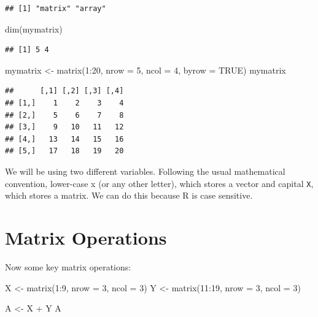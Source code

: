 \documentclass[
]{book}
\newenvironment{Shaded}{\begin{snugshade}}{\end{snugshade}}
\newcommand{\AttributeTok}[1]{\textcolor[rgb]{0.77,0.63,0.00}{#1}}
\newcommand{\ConstantTok}[1]{\textcolor[rgb]{0.00,0.00,0.00}{#1}}
\newcommand{\DecValTok}[1]{\textcolor[rgb]{0.00,0.00,0.81}{#1}}
\newcommand{\FunctionTok}[1]{\textcolor[rgb]{0.00,0.00,0.00}{#1}}
\newcommand{\NormalTok}[1]{#1}
\newcommand{\OtherTok}[1]{\textcolor[rgb]{0.56,0.35,0.01}{#1}}
\newcommand{\SpecialCharTok}[1]{\textcolor[rgb]{0.00,0.00,0.00}{#1}}
\theoremstyle{definition}
\theoremstyle{definition}
\theoremstyle{definition}
\theoremstyle{definition}
\theoremstyle{remark}
\begin{document}
\begin{verbatim}
## [1] "matrix" "array"
\end{verbatim}

\begin{Shaded}
\begin{Highlighting}[]
\FunctionTok{dim}\NormalTok{(mymatrix)}
\end{Highlighting}
\end{Shaded}

\begin{verbatim}
## [1] 5 4
\end{verbatim}

\begin{Shaded}
\begin{Highlighting}[]
\NormalTok{mymatrix }\OtherTok{\textless{}{-}} \FunctionTok{matrix}\NormalTok{(}\DecValTok{1}\SpecialCharTok{:}\DecValTok{20}\NormalTok{, }\AttributeTok{nrow =} \DecValTok{5}\NormalTok{, }\AttributeTok{ncol =} \DecValTok{4}\NormalTok{, }\AttributeTok{byrow =} \ConstantTok{TRUE}\NormalTok{)}
\NormalTok{mymatrix}
\end{Highlighting}
\end{Shaded}

\begin{verbatim}
##      [,1] [,2] [,3] [,4]
## [1,]    1    2    3    4
## [2,]    5    6    7    8
## [3,]    9   10   11   12
## [4,]   13   14   15   16
## [5,]   17   18   19   20
\end{verbatim}

We will be using two different variables. Following the usual mathematical convention, lower-case x (or any other letter), which stores a vector and capital \texttt{X}, which stores a matrix. We can do this because R is case sensitive.

\hypertarget{matrix-operations}{%
\section{Matrix Operations}\label{matrix-operations}}

Now some key matrix operations:

\begin{Shaded}
\begin{Highlighting}[]
\NormalTok{X }\OtherTok{\textless{}{-}} \FunctionTok{matrix}\NormalTok{(}\DecValTok{1}\SpecialCharTok{:}\DecValTok{9}\NormalTok{, }\AttributeTok{nrow =} \DecValTok{3}\NormalTok{, }\AttributeTok{ncol =} \DecValTok{3}\NormalTok{)}
\NormalTok{Y }\OtherTok{\textless{}{-}} \FunctionTok{matrix}\NormalTok{(}\DecValTok{11}\SpecialCharTok{:}\DecValTok{19}\NormalTok{, }\AttributeTok{nrow =} \DecValTok{3}\NormalTok{, }\AttributeTok{ncol =} \DecValTok{3}\NormalTok{)}

\NormalTok{A }\OtherTok{\textless{}{-}}\NormalTok{ X }\SpecialCharTok{+}\NormalTok{ Y}
\NormalTok{A}
\end{Highlighting}
\end{Shaded}
\end{document}
